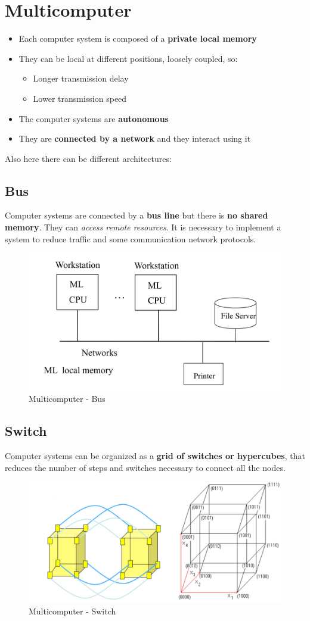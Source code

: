 \section{Multicomputer}
\begin{itemize}
    \item Each computer system is composed of a \textbf{private local memory}
    \item They can be local at different positions, loosely coupled, so:
    \begin{itemize}
        \item Longer transmission delay
        \item Lower transmission speed
    \end{itemize}
    \item The computer systems are \textbf{autonomous}
    \item They are \textbf{connected by a network} and they interact using it
\end{itemize}
Also here there can be different architectures:
\subsection{Bus}
Computer systems are connected by a \textbf{bus line} but there is \textbf{no shared memory}. They can \textit{access remote resources}. It is necessary to implement a system to reduce traffic and some communication network protocols.
\begin{figure}[!h]
            \centering
            \includegraphics[width=.45\linewidth]{images/distributedSystem/multicomputerBus.jpeg}
            \caption{Multicomputer - Bus}
    \end{figure}
    
\subsection{Switch}
Computer systems can be organized as a \textbf{grid of switches or hypercubes}, that reduces the number of steps and switches necessary to connect all the nodes.
\begin{figure}[!h]
            \centering
            \includegraphics[width=.7\linewidth]{images/distributedSystem/multipcSwitch.jpeg}
            \caption{Multicomputer - Switch}
    \end{figure}
    
